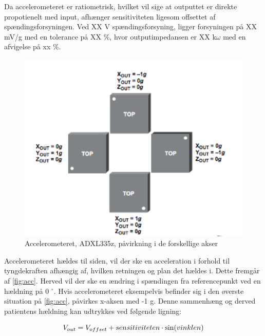 Da accelerometeret er ratiometrisk, hvilket vil sige at outputtet er direkte propotienelt med input, afhænger sensitiviteten ligesom offsettet af spændingsforsyningen. Ved XX V spændingsforsyning, ligger forsyningen på XX mV/g med en tolerance på XX \%, hvor outputimpedansen er XX k$\omega$ med en afvigelse på xx \%. 

\begin{figure}[H]
\centering
\includegraphics[width=1\textwidth]{figures/acc.png}
\caption{Accelerometeret, ADXL335z, påvirkning i de forskellige akser}
\label{fig:acc}
\end{figure}

\noindent
Accelerometeret hældes til siden, vil der ske en acceleration i forhold til tyngdekraften afhængig af, hvilken retningen og plan det hældes i. Dette fremgår af \autoref{fig:acc}. Herved vil der ske en ændring i spændingen fra referencepunkt ved en hældning på 0 $^{\circ}$. Hvis accelerometeret eksempelvis befinder sig i den øverste situation på \autoref{fig:acc}, påvirkes x-aksen med -1 g. Denne sammenhæng og derved patientens hældning kan udtrykkes ved følgende ligning:

\begin{equation}
	V_{out} = V_{offset} + sensitiviteten \cdot \sin(vinklen) \\
\end{equation}


